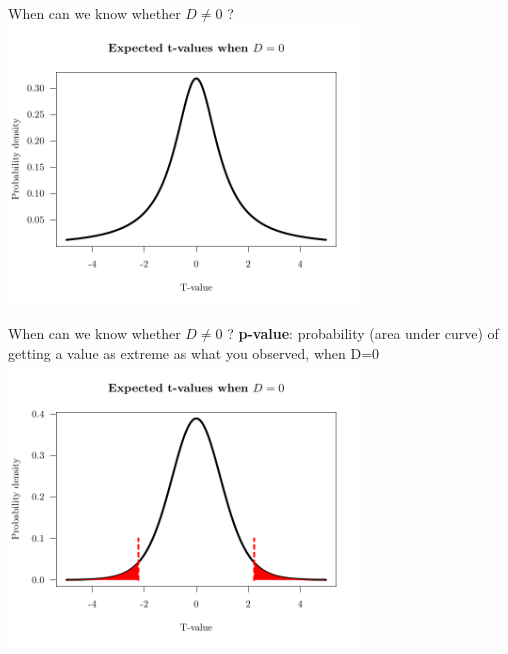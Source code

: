 \documentclass{beamer}
\begin{document}
\begin{frame}{When can we know whether $D \neq 0$ ?}
  \centering \includegraphics[width=0.7\textwidth]{Figures/figure/tvalue-1}
\end{frame}


\begin{frame}{When can we know whether $D \neq 0$ ?}
\textbf{p-value}: probability (area under curve) of getting a value as extreme as what you observed, when D=0
\centering  \includegraphics[width=0.7\textwidth]{Figures/figure/tvalueth-1}
\end{frame}
\end{document}
